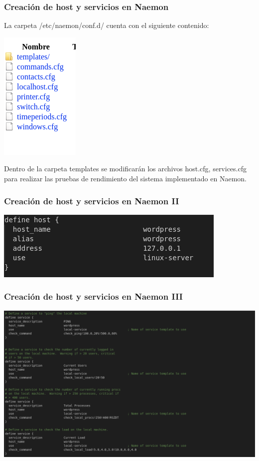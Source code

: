 \documentclass{beamer}
\theoremstyle{plain}
\theoremstyle{definition}
\theoremstyle{plain}
\theoremstyle{definition}
\theoremstyle{remark}
\theoremstyle{definition}
\begin{document}
\begin{frame}
	\frametitle{Creación de host y servicios en Naemon}
	La carpeta /etc/naemon/conf.d/ cuenta con el siguiente contenido:
		
	\centering
	\includegraphics[scale=0.3]{imagenes/confd.png}
	
	Dentro de la carpeta templates se modificarán los archivos host.cfg, services.cfg para realizar las pruebas de rendimiento del sistema implementado en Naemon.
	
\end{frame}
\begin{frame}
	\frametitle{Creación de host y servicios en Naemon II}

	\centering
	\includegraphics[scale=0.2]{imagenes/analisis_naemon/host.png}

	
\end{frame}
\begin{frame}
	\frametitle{Creación de host y servicios en Naemon III}
	
	
	\centering
	\includegraphics[scale=0.25]{imagenes/analisis_naemon/services1.png}

	
\end{frame}
\end{document}
